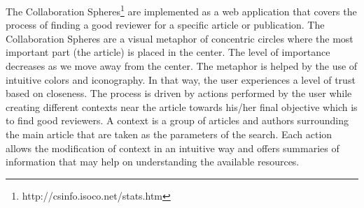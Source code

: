 The Collaboration Spheres\footnote{http://csinfo.isoco.net/stats.htm} are implemented as a web application that covers the process
of finding a good reviewer for a specific article or publication. The Collaboration Spheres are a visual metaphor of concentric circles where the most important part (the article) is placed in the center. The level of importance decreases as we move away from the center. The metaphor is helped by the use of intuitive colors and iconography. In that way, the user experiences a level of trust based on closeness. The process is driven by actions performed by the user while creating different contexts near the article towards his/her final objective which is to find good reviewers. A context is a group of articles and authors surrounding the main article that are taken as the parameters of the search. Each action allows the modification of context in an intuitive way and offers summaries of information that may help on understanding the available resources.\\
\vspace{-5mm}
